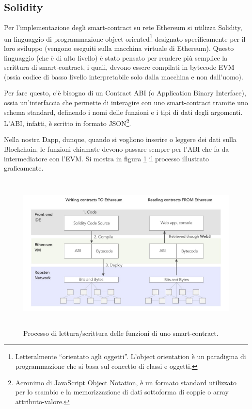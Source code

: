 \subsection{Solidity}\label{Solidity}
Per l'implementazione degli smart-contract su rete Ethereum si utilizza Solidity,  un linguaggio di programmazione object-oriented\footnote{Letteralmente “orientato agli oggetti”. L'object orientation è un paradigma di programmazione che si basa sul concetto di classi e oggetti.} designato specificamente per il loro sviluppo (vengono eseguiti sulla macchina virtuale di Ethereum)\cite{Solidity_docs}. Questo linguaggio (che è di alto livello) è stato pensato per rendere più semplice la scrittura di smart-contract, i quali, devono essere compilati in bytecode EVM (ossia codice di basso livello interpretabile solo dalla macchina e non dall'uomo).

Per fare questo, c'è bisogno di un Contract ABI (o Application Binary Interface), ossia un'interfaccia che permette di interagire con uno smart-contract tramite uno schema standard, definendo i nomi delle funzioni e i tipi di dati degli argomenti. L'ABI, infatti, è scritto in formato JSON\footnote{Acronimo di JavaScript Object Notation, è un formato standard utilizzato per lo scambio e la memorizzazione di dati sottoforma di coppie o array attributo-valore.}.

Nella nostra Dapp, dunque, quando si vogliono inserire o leggere dei dati sulla Blockchain, le funzioni chiamate devono passare sempre per l'ABI che fa da intermediatore con l'EVM. Si mostra in figura \ref{contratti_img} il processo illustrato graficamente.

\begin{figure}[h]
    \centering
    \includegraphics[width=13cm,height=8cm]{Immagini/Contratti_ETH.png}
    \caption[Rappresentazione grafica del processo di lettura/scrittura delle funzioni di uno smart-contract]{Processo di lettura/scrittura delle funzioni di uno smart-contract.}
    \label{contratti_img}
\end{figure}

